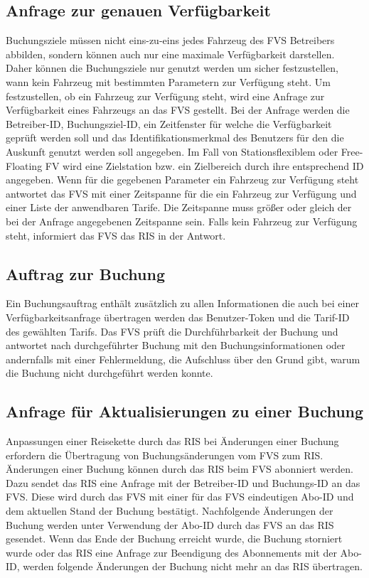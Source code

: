 \subsection{Anfrage zur genauen Verfügbarkeit}
Buchungsziele müssen nicht eins-zu-eins jedes Fahrzeug des FVS Betreibers abbilden, sondern können auch nur eine maximale Verfügbarkeit darstellen. Daher können die Buchungsziele nur genutzt werden um sicher festzustellen, wann kein Fahrzeug mit bestimmten Parametern zur Verfügung steht. Um festzustellen, ob ein Fahrzeug zur Verfügung steht, wird eine Anfrage zur Verfügbarkeit eines Fahrzeugs an das FVS gestellt. Bei der Anfrage werden die Betreiber-ID, Buchungsziel-ID, ein Zeitfenster für welche die Verfügbarkeit geprüft werden soll und das Identifikationsmerkmal des Benutzers für den die Auskunft genutzt werden soll angegeben. Im Fall von Stationsflexiblem oder Free-Floating FV wird eine Zielstation bzw. ein Zielbereich durch ihre entsprechend ID angegeben. Wenn für die gegebenen Parameter ein Fahrzeug zur Verfügung steht antwortet das FVS mit einer Zeitspanne für die ein Fahrzeug zur Verfügung und einer Liste der anwendbaren Tarife. Die Zeitspanne muss größer oder gleich der bei der Anfrage angegebenen Zeitspanne sein. Falls kein Fahrzeug zur Verfügung steht, informiert das FVS das RIS in der Antwort.

\subsection{Auftrag zur Buchung}
Ein Buchungsauftrag enthält zusätzlich zu allen Informationen die auch bei einer Verfügbarkeitsanfrage übertragen werden das Benutzer-Token und die Tarif-ID des gewählten Tarifs. Das FVS prüft die Durchführbarkeit der Buchung und antwortet nach durchgeführter Buchung mit den Buchungsinformationen oder andernfalls mit einer Fehlermeldung, die Aufschluss über den Grund gibt, warum die Buchung nicht durchgeführt werden konnte.

\subsection{Anfrage für Aktualisierungen zu einer Buchung}
Anpassungen einer Reisekette durch das RIS bei Änderungen einer Buchung erfordern die Übertragung von Buchungsänderungen vom FVS zum RIS. Änderungen einer Buchung können durch das RIS beim FVS abonniert werden. Dazu sendet das RIS eine Anfrage mit der Betreiber-ID und Buchungs-ID an das FVS. Diese wird durch das FVS mit einer für das FVS eindeutigen Abo-ID und dem aktuellen Stand der Buchung bestätigt. Nachfolgende Änderungen der Buchung werden unter Verwendung der Abo-ID durch das FVS an das RIS gesendet. Wenn das Ende der Buchung erreicht wurde, die Buchung storniert wurde oder das RIS eine Anfrage zur Beendigung des Abonnements mit der Abo-ID, werden folgende Änderungen der Buchung nicht mehr an das RIS übertragen.

